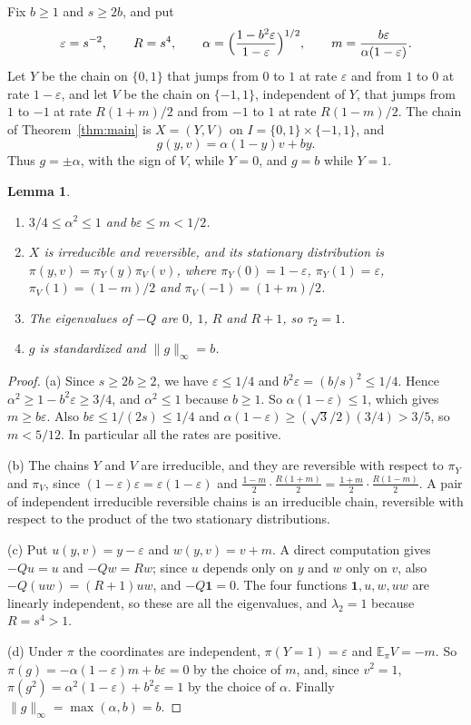 \documentclass[11pt]{amsart}
\newtheorem{lemma}{Lemma}
\theoremstyle{remark}
\numberwithin{equation}{section}
\newcommand{\E}{\mathbb E}
\begin{document}
Fix $b\ge1$ and $s\ge2b$, and put
\[
\varepsilon=s^{-2},\qquad R=s^4,\qquad \alpha=\Bigl(\frac{1-b^2\varepsilon}{1-\varepsilon}\Bigr)^{1/2},\qquad m=\frac{b\varepsilon}{\alpha(1-\varepsilon)} .
\]
Let $Y$ be the chain on $\{0,1\}$ that jumps from $0$ to $1$ at rate $\varepsilon$ and from $1$ to $0$ at rate $1-\varepsilon$, and let $V$ be the chain on $\{-1,1\}$, independent of $Y$, that jumps from $1$ to $-1$ at rate $R(1+m)/2$ and from $-1$ to $1$ at rate $R(1-m)/2$. The chain of Theorem~\ref{thm:main} is $X=(Y,V)$ on $I=\{0,1\}\times\{-1,1\}$, and
\[
g(y,v)=\alpha(1-y)v+by .
\]
Thus $g=\pm\alpha$, with the sign of $V$, while $Y=0$, and $g=b$ while $Y=1$.

\begin{lemma}\label{lem:chain}
\begin{enumerate}[label=\textup{(\alph*)}]
\item $3/4\le\alpha^2\le1$ and $b\varepsilon\le m<1/2$.
\item $X$ is irreducible and reversible, and its stationary distribution is $\pi(y,v)=\pi_Y(y)\pi_V(v)$, where $\pi_Y(0)=1-\varepsilon$, $\pi_Y(1)=\varepsilon$, $\pi_V(1)=(1-m)/2$ and $\pi_V(-1)=(1+m)/2$.
\item The eigenvalues of $-Q$ are $0$, $1$, $R$ and $R+1$, so $\tau_2=1$.
\item $g$ is standardized and $\|g\|_\infty=b$.
\end{enumerate}
\end{lemma}

\begin{proof}
(a) Since $s\ge2b\ge2$, we have $\varepsilon\le1/4$ and $b^2\varepsilon=(b/s)^2\le1/4$. Hence $\alpha^2\ge1-b^2\varepsilon\ge3/4$, and $\alpha^2\le1$ because $b\ge1$. So $\alpha(1-\varepsilon)\le1$, which gives $m\ge b\varepsilon$. Also $b\varepsilon\le1/(2s)\le1/4$ and $\alpha(1-\varepsilon)\ge(\sqrt3/2)(3/4)>3/5$, so $m<5/12$. In particular all the rates are positive.

(b) The chains $Y$ and $V$ are irreducible, and they are reversible with respect to $\pi_Y$ and $\pi_V$, since $(1-\varepsilon)\varepsilon=\varepsilon(1-\varepsilon)$ and $\frac{1-m}2\cdot\frac{R(1+m)}2=\frac{1+m}2\cdot\frac{R(1-m)}2$. A pair of independent irreducible reversible chains is an irreducible chain, reversible with respect to the product of the two stationary distributions.

(c) Put $u(y,v)=y-\varepsilon$ and $w(y,v)=v+m$. A direct computation gives $-Qu=u$ and $-Qw=Rw$; since $u$ depends only on $y$ and $w$ only on $v$, also $-Q(uw)=(R+1)uw$, and $-Q\mathbf 1=0$. The four functions $\mathbf 1,u,w,uw$ are linearly independent, so these are all the eigenvalues, and $\lambda_2=1$ because $R=s^4>1$.

(d) Under $\pi$ the coordinates are independent, $\pi(Y=1)=\varepsilon$ and $\E_\pi V=-m$. So $\pi(g)=-\alpha(1-\varepsilon)m+b\varepsilon=0$ by the choice of $m$, and, since $v^2=1$, $\pi(g^2)=\alpha^2(1-\varepsilon)+b^2\varepsilon=1$ by the choice of $\alpha$. Finally $\|g\|_\infty=\max(\alpha,b)=b$.
\end{proof}
\end{document}

